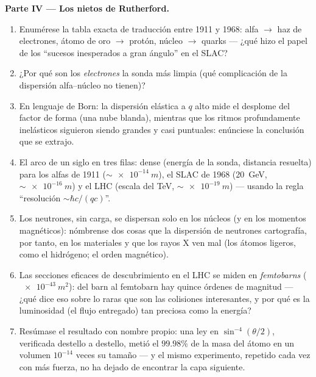 \begin{problem}
\medskip\noindent\textbf{Parte IV --- Los nietos de Rutherford.}
\begin{enumerate}[resume]
  \item Enumérese la tabla exacta de traducción entre 1911 y 1968:
        alfa $\to$ haz de electrones, átomo de oro $\to$ protón,
        núcleo $\to$ quarks --- ¿qué hizo el papel de los ``sucesos
        inesperados a gran ángulo'' en el SLAC?
  \item ¿Por qué son los \emph{electrones} la sonda más limpia (qué
        complicación de la dispersión alfa--núcleo no tienen)?
  \item En lenguaje de Born: la dispersión elástica a $q$ alto mide el
        desplome del factor de forma (una nube blanda), mientras que los
        ritmos profundamente inelásticos siguieron siendo grandes y casi
        puntuales: enúnciese la conclusión que se extrajo.
  \item El arco de un siglo en tres filas: dense (energía de la sonda,
        distancia resuelta) para los alfas de 1911 ($\sim\qty{e-14}{m}$),
        el SLAC de 1968 (\qty{20}{GeV}, $\sim\qty{e-16}{m}$) y el
        LHC (escala del TeV, $\sim\qty{e-19}{m}$) --- usando
        la regla ``resolución $\sim \hbar c/(qc)$''.
  \item Los neutrones, sin carga, se dispersan solo en los núcleos (y en
        los momentos magnéticos): nómbrense dos cosas que la dispersión de
        neutrones cartografía, por tanto, en los materiales y que los
        rayos X ven mal (los átomos ligeros, como el hidrógeno; el orden
        magnético).
  \item Las secciones eficaces de descubrimiento en el LHC se miden en
        \emph{femtobarns} ($\qty{e-43}{m^2}$): del barn al
        femtobarn hay quince órdenes de magnitud --- ¿qué dice eso sobre
        lo raras que son las colisiones interesantes, y por qué es la
        luminosidad (el flujo entregado) tan preciosa como la energía?
  \item Resúmase el resultado con nombre propio: una ley en
        $\sin^{-4}(\theta/2)$, verificada destello a destello, metió el
        $99.98\%$ de la masa del átomo en un volumen $10^{-14}$ veces su
        tamaño --- y el mismo experimento, repetido cada vez con más
        fuerza, no ha dejado de encontrar la capa siguiente.
\end{enumerate}
\end{problem}
